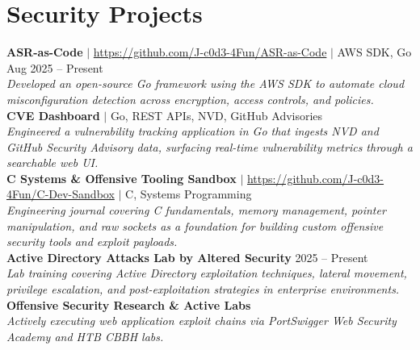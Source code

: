 \documentclass[letterpaper,10pt]{article}
\begin{document}
\section*{Security Projects}
\textbf{ASR-as-Code} $|$ \underline{https://github.com/J-c0d3-4Fun/ASR-as-Code} $|$ AWS SDK, Go \hfill Aug 2025 -- Present \\
\textit{Developed an open-source Go framework using the AWS SDK to automate cloud misconfiguration detection across encryption, access controls, and policies.} \\
\vspace{2pt}
\textbf{CVE Dashboard} $|$ Go, REST APIs, NVD, GitHub Advisories \hfill \\
\textit{Engineered a vulnerability tracking application in Go that ingests NVD and GitHub Security Advisory data, surfacing real-time vulnerability metrics through a searchable web UI.} \\
\vspace{2pt}
\textbf{C Systems \& Offensive Tooling Sandbox} $|$ \underline{https://github.com/J-c0d3-4Fun/C-Dev-Sandbox} $|$ C, Systems Programming \hfill \\
\textit{Engineering journal covering C fundamentals, memory management, pointer manipulation, and raw sockets as a foundation for building custom offensive security tools and exploit payloads.} \\
\vspace{2pt}
\textbf{Active Directory Attacks Lab by Altered Security} \hfill 2025 -- Present \\
\textit{Lab training covering Active Directory exploitation techniques, lateral movement, privilege escalation, and post-exploitation strategies in enterprise environments.} \\
\vspace{2pt}
\textbf{Offensive Security Research \& Active Labs} \hfill \\
\textit{Actively executing web application exploit chains via PortSwigger Web Security Academy and HTB CBBH labs.}

\end{document}
